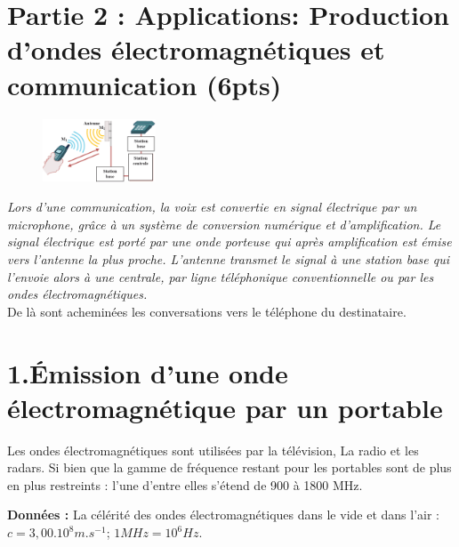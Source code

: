 \documentclass[12pt]{article}
\begin{document}
\section*{Partie 2 :  Applications: Production d'ondes électromagnétiques et
communication \dotfill(6pts)}

\begin{figure}
	\vspace{-1.2cm}
\begin{center}
  \includegraphics[width=0.3\textwidth]{./ex_031.png}
\end{center}
\vspace{-0.9cm}
\caption{}
\end{figure}



\emph{Lors d’une communication, la voix est convertie en signal électrique par un microphone, grâce à un système de
conversion numérique et d’amplification. Le signal électrique est porté par une onde porteuse qui après
amplification est émise vers l’antenne la plus proche. L’antenne transmet le signal à une station base qui
l’envoie alors à une centrale, par ligne téléphonique conventionnelle ou par les ondes électromagnétiques.}
 \\De là sont acheminées les conversations vers le
téléphone du destinataire.

\section*{1.Émission d’une onde électromagnétique par un portable}

Les ondes électromagnétiques sont utilisées par la
télévision, La radio et les radars. Si bien que la gamme de
fréquence restant pour les portables sont de plus en plus
restreints : l’une d’entre elles s’étend de 900 à 1800 MHz.

\textbf{Données : }La célérité des ondes électromagnétiques
dans le vide et dans l’air : $c = 3,00.10^8 m.s^{-1}$; $1MHz =10^6Hz$.
\end{document}
